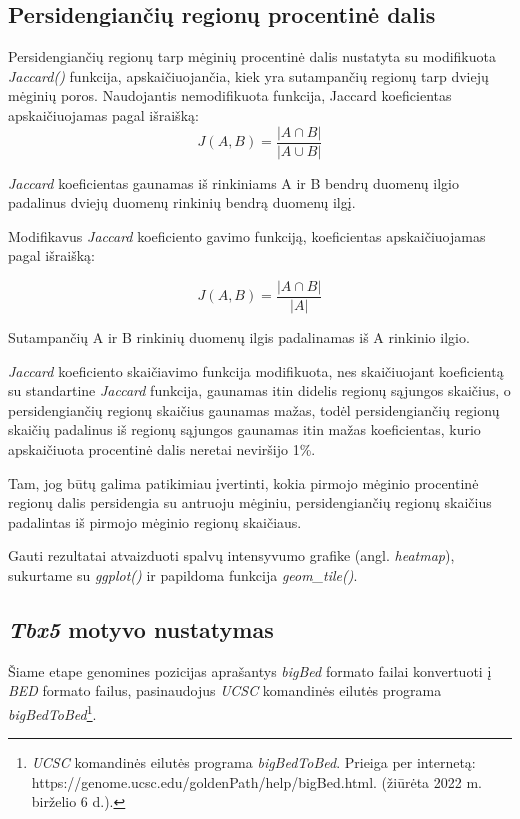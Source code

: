 \documentclass[12pt]{article}
\begin{document}
\subsection{Persidengiančių regionų procentinė dalis}
Persidengiančių regionų tarp mėginių procentinė dalis nustatyta
su modifikuota \emph{Jaccard()} funkcija, apskaičiuojančia,
kiek yra sutampančių regionų tarp dviejų mėginių poros.
Naudojantis nemodifikuota funkcija, Jaccard koeficientas
apskaičiuojamas pagal išraišką:
\[ J(A, B) =  \frac{|A \cap B|}{|A \cup B|} \]

\emph{Jaccard} koeficientas gaunamas iš rinkiniams A ir B bendrų duomenų ilgio
padalinus dviejų duomenų rinkinių bendrą duomenų ilgį.

Modifikavus \emph{Jaccard} koeficiento gavimo funkciją, koeficientas
apskaičiuojamas pagal išraišką:

\[ J(A, B) = \frac{|A \cap B|}{|A|} \]

Sutampančių A ir B rinkinių duomenų ilgis padalinamas iš A rinkinio
ilgio.

\emph{Jaccard} koeficiento skaičiavimo funkcija modifikuota, nes
skaičiuojant koeficientą su standartine \emph{Jaccard} funkcija,
gaunamas itin didelis regionų sąjungos skaičius, o
persidengiančių regionų skaičius gaunamas mažas, todėl
persidengiančių regionų skaičių padalinus iš regionų sąjungos
gaunamas itin mažas koeficientas, kurio apskaičiuota procentinė
dalis neretai neviršijo 1\%.

Tam, jog būtų galima patikimiau įvertinti, kokia pirmojo mėginio
procentinė regionų dalis persidengia su antruoju mėginiu,
persidengiančių regionų skaičius padalintas iš pirmojo mėginio
regionų skaičiaus.

Gauti rezultatai atvaizduoti spalvų intensyvumo grafike (angl.
\emph{heatmap}), sukurtame su \emph{ggplot()} ir papildoma funkcija
\emph{geom\_tile()}.

\subsection{\emph{Tbx5} motyvo nustatymas}
Šiame etape genomines pozicijas aprašantys \emph{bigBed} formato
failai konvertuoti į \emph{BED} formato failus, pasinaudojus
\emph{UCSC} komandinės eilutės programa \emph{bigBedToBed}\footnote
{\emph{UCSC} komandinės eilutės programa \emph{bigBedToBed}.
Prieiga per internetą:\\ https://genome.ucsc.edu/goldenPath/help/bigBed.html.
(žiūrėta 2022 m. birželio 6 d.).}.
\end{document}
